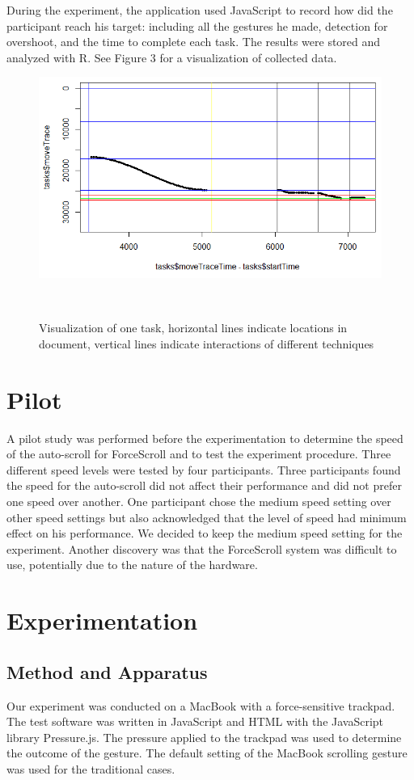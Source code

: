 \documentclass{sigchi}
\begin{document}
During the experiment, the application used JavaScript to record how did the participant reach his target: including all the gestures he made, detection for overshoot, and the time to complete each task. The results were stored and analyzed with R. See Figure 3 for a visualization of collected data.

\begin{figure}[!h]
    \centering
    \includegraphics[width=0.9\columnwidth]{figures/Picture1}
    \caption{Visualization of one task, horizontal lines indicate locations in document, vertical lines indicate interactions of different techniques}~\label{fig:figure3}
\end{figure}

\section{Pilot}
A pilot study was performed before the experimentation to determine the speed of the auto-scroll for ForceScroll and to test the experiment procedure. Three different speed levels were tested by four participants. Three participants found the speed for the auto-scroll did not affect their performance and did not prefer one speed over another. One participant chose the medium speed setting over other speed settings but also acknowledged that the level of speed had minimum effect on his performance. We decided to keep the medium speed setting for the experiment. Another discovery was that the ForceScroll system was difficult to use, potentially due to the nature of the hardware.   


\section{Experimentation}

\subsection{Method and Apparatus}
Our experiment was conducted on a MacBook with a force-sensitive trackpad. The test software was written in JavaScript and HTML with the JavaScript library Pressure.js. The pressure applied to the trackpad was used to determine the outcome of the gesture. The default setting of the MacBook scrolling gesture was used for the traditional cases. 
\end{document}
